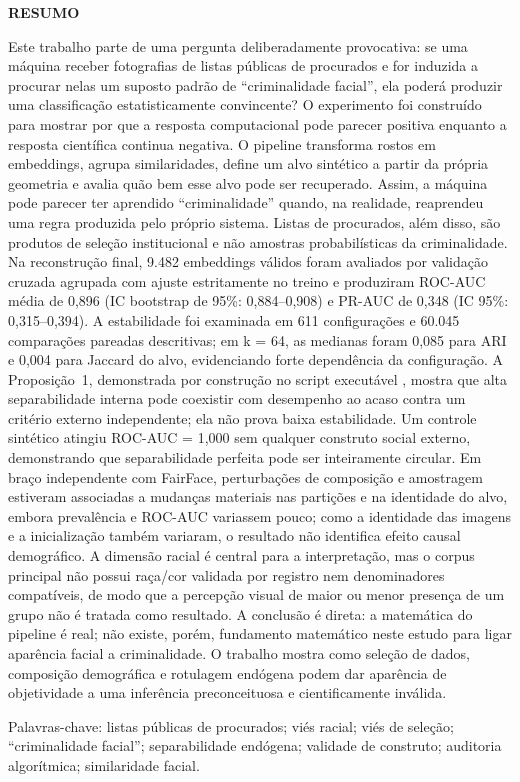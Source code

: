 \documentclass[12pt,oneside,a4paper,openany,brazil]{abntex2}
\newcommand{\frontheading}[1]{\par\noindent\textbf{#1}\par\vspace{3pt}}
\begin{document}
\begingroup\SingleSpacing\setlength{\parindent}{0pt}\fontsize{10.5}{13.2}\selectfont
\frontheading{RESUMO}
Este trabalho parte de uma pergunta deliberadamente provocativa: se uma máquina receber fotografias de listas públicas de procurados e for induzida a procurar nelas um suposto padrão de ``criminalidade facial'', ela poderá produzir uma classificação estatisticamente convincente? O experimento foi construído para mostrar por que a resposta computacional pode parecer positiva enquanto a resposta científica continua negativa. O pipeline transforma rostos em embeddings, agrupa similaridades, define um alvo sintético a partir da própria geometria e avalia quão bem esse alvo pode ser recuperado. Assim, a máquina pode parecer ter aprendido ``criminalidade'' quando, na realidade, reaprendeu uma regra produzida pelo próprio sistema. Listas de procurados, além disso, são produtos de seleção institucional e não amostras probabilísticas da criminalidade. Na reconstrução final, 9.482 embeddings válidos foram avaliados por validação cruzada agrupada com ajuste estritamente no treino e produziram ROC-AUC média de 0,896 (IC bootstrap de 95\%: 0,884--0,908) e PR-AUC de 0,348 (IC 95\%: 0,315--0,394). A estabilidade foi examinada em 611 configurações e 60.045 comparações pareadas descritivas; em k = 64, as medianas foram 0,085 para ARI e 0,004 para Jaccard do alvo, evidenciando forte dependência da configuração. A Proposição~1, demonstrada por construção no script executável , mostra que alta separabilidade interna pode coexistir com desempenho ao acaso contra um critério externo independente; ela não prova baixa estabilidade. Um controle sintético atingiu ROC-AUC = 1,000 sem qualquer construto social externo, demonstrando que separabilidade perfeita pode ser inteiramente circular. Em braço independente com FairFace, perturbações de composição e amostragem estiveram associadas a mudanças materiais nas partições e na identidade do alvo, embora prevalência e ROC-AUC variassem pouco; como a identidade das imagens e a inicialização também variaram, o resultado não identifica efeito causal demográfico. A dimensão racial é central para a interpretação, mas o corpus principal não possui raça/cor validada por registro nem denominadores compatíveis, de modo que a percepção visual de maior ou menor presença de um grupo não é tratada como resultado. A conclusão é direta: a matemática do pipeline é real; não existe, porém, fundamento matemático neste estudo para ligar aparência facial a criminalidade. O trabalho mostra como seleção de dados, composição demográfica e rotulagem endógena podem dar aparência de objetividade a uma inferência preconceituosa e cientificamente inválida.\par\vspace{4pt}
Palavras-chave: listas públicas de procurados; viés racial; viés de seleção; ``criminalidade facial''; separabilidade endógena; validade de construto; auditoria algorítmica; similaridade facial.
\endgroup
\clearpage
\end{document}
